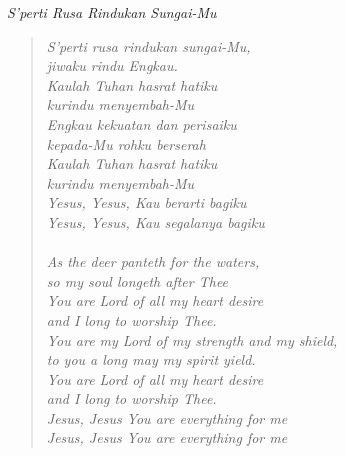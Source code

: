 \small
\begin{center}
\itshape{S'perti Rusa Rindukan Sungai-Mu}
\end{center}


\begin{verse}
\itshape{
S'perti rusa rindukan sungai-Mu, \\
jiwaku rindu Engkau.\\
Kaulah Tuhan hasrat hatiku\\
kurindu menyembah-Mu\\
Engkau kekuatan dan perisaiku\\
kepada-Mu rohku berserah\\
Kaulah Tuhan hasrat hatiku\\
kurindu menyembah-Mu\\
Yesus, Yesus, Kau berarti bagiku\\
Yesus, Yesus, Kau segalanya bagiku\\
{~}\\
As the deer panteth for the waters,\\
so my soul longeth after Thee\\
You are Lord of all my heart desire\\ 
and I long to worship Thee.\\
You are my Lord of my strength and my shield, \\
to you a long may my spirit yield.\\
You are Lord of all my heart desire\\ 
and I long to worship Thee.\\
Jesus, Jesus You are everything for me\\
Jesus, Jesus You are everything for me
}
\end{verse}
\normalsize

